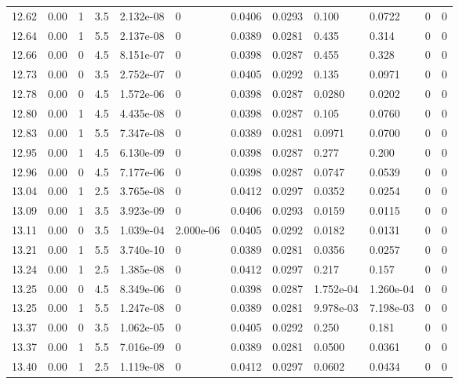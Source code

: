 \documentclass[preview]{standalone}
\begin{document}
{{{{{{{{{\begin{tabular}{L{1.2cm}C{1.2cm} C{0.3cm}C{0.5cm} C{1.4cm}C{1.4cm} C{1.4cm}C{1.4cm} C{1.6cm}C{1.6cm} C{1.6cm}C{1.6cm}}
  12.62  &  0.00  & 1     & 3.5 &  2.132e-08  & 0  &  0.0406&   0.0293& 0.100 & 0.0722   &  0 & 0  \\ 
  12.64  &  0.00  & 1     & 5.5 &  2.137e-08  & 0  &  0.0389&   0.0281& 0.435 & 0.314   &  0 & 0  \\ 
  12.66  &  0.00  & 0     & 4.5 &  8.151e-07  & 0  &  0.0398&   0.0287& 0.455 & 0.328   &  0 & 0  \\ 
  12.73  &  0.00  & 0     & 3.5 &  2.752e-07  & 0  &  0.0405&   0.0292& 0.135 & 0.0971   &  0 & 0  \\ 
  12.78  &  0.00  & 0     & 4.5 &  1.572e-06  & 0  &  0.0398&   0.0287& 0.0280 & 0.0202   &  0 & 0  \\ 
  12.80  &  0.00  & 1     & 4.5 &  4.435e-08  & 0  &  0.0398&   0.0287& 0.105 & 0.0760   &  0 & 0  \\ 
  12.83  &  0.00  & 1     & 5.5 &  7.347e-08  & 0  &  0.0389&   0.0281& 0.0971 & 0.0700   &  0 & 0  \\ 
  12.95  &  0.00  & 1     & 4.5 &  6.130e-09  & 0  &  0.0398&   0.0287& 0.277 & 0.200   &  0 & 0  \\ 
  12.96  &  0.00  & 0     & 4.5 &  7.177e-06  & 0  &  0.0398&   0.0287& 0.0747 & 0.0539   &  0 & 0  \\ 
  13.04  &  0.00  & 1     & 2.5 &  3.765e-08  & 0  &  0.0412&   0.0297& 0.0352 & 0.0254   &  0 & 0  \\ 
  13.09  &  0.00  & 1     & 3.5 &  3.923e-09  & 0  &  0.0406&   0.0293& 0.0159 & 0.0115   &  0 & 0  \\ 
  13.11  &  0.00  & 0     & 3.5 &  1.039e-04  & 2.000e-06  &  0.0405&   0.0292& 0.0182 & 0.0131   &  0 & 0  \\ 
  13.21  &  0.00  & 1     & 5.5 &  3.740e-10  & 0  &  0.0389&   0.0281& 0.0356 & 0.0257   &  0 & 0  \\ 
  13.24  &  0.00  & 1     & 2.5 &  1.385e-08  & 0  &  0.0412&   0.0297& 0.217 & 0.157   &  0 & 0  \\ 
  13.25  &  0.00  & 0     & 4.5 &  8.349e-06  & 0  &  0.0398&   0.0287& 1.752e-04 & 1.260e-04   &  0 & 0  \\ 
  13.25  &  0.00  & 1     & 5.5 &  1.247e-08  & 0  &  0.0389&   0.0281& 9.978e-03 & 7.198e-03   &  0 & 0  \\ 
  13.37  &  0.00  & 0     & 3.5 &  1.062e-05  & 0  &  0.0405&   0.0292& 0.250 & 0.181   &  0 & 0  \\ 
  13.37  &  0.00  & 1     & 5.5 &  7.016e-09  & 0  &  0.0389&   0.0281& 0.0500 & 0.0361   &  0 & 0  \\ 
  13.40  &  0.00  & 1     & 2.5 &  1.119e-08  & 0  &  0.0412&   0.0297& 0.0602 & 0.0434   &  0 & 0  \\ 

\end{tabular}}}}}}}}}}
\end{document}
